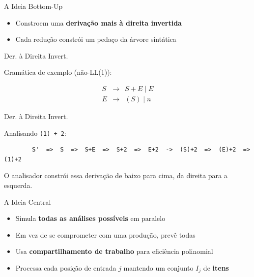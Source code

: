 \begin{frame}{A Ideia Bottom-Up}

    \begin{itemize}

        \item
        Constroem uma \textbf{derivação mais à direita invertida}
        \item
        Cada redução constrói um pedaço da árvore sintática
    \end{itemize}
\end{frame}

\begin{frame}{Der. à Direita Invert.}

    Gramática de exemplo (não-LL(1)):

    \[\begin{array}{lcl}
    S &\to& S + E \mid E \\
    E &\to& (S) \mid n
\end{array}\]
\end{frame}

\begin{frame}[fragile]{Der. à Direita Invert.}

    Analisando \texttt{(1) + 2}:

    \begin{lstlisting}
        S'  =>  S  =>  S+E  =>  S+2  =>  E+2  ->  (S)+2  =>  (E)+2  =>  (1)+2
    \end{lstlisting}

    O analisador constrói essa derivação de baixo para cima, da direita para
    a esquerda.
\end{frame}



\begin{frame}{A Ideia Central}

    \begin{itemize}

        \item
        Simula \textbf{todas as análises possíveis} em paralelo
        \item
        Em vez de se comprometer com uma produção, prevê todas
        \item
        Usa \textbf{compartilhamento de trabalho} para eficiência polinomial
        \item
        Processa cada posição de entrada \(j\) mantendo um conjunto \(I_j\) de
        \textbf{itens}
    \end{itemize}
\end{frame}

